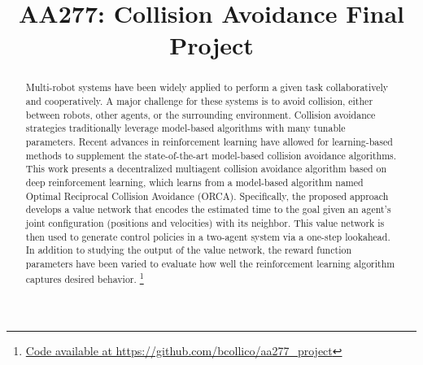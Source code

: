 \documentclass[conference]{IEEEtran}
\begin{document}
\title{AA277: Collision Avoidance Final Project\\
}

\author{
\and
{}
\linebreakand
{}
\and
{}
}

\maketitle
\begin{abstract}
Multi-robot systems have been widely applied to perform a given task collaboratively and cooperatively. A major challenge for these systems is to avoid collision, either between robots, other agents, or the surrounding environment.
Collision avoidance strategies traditionally leverage model-based algorithms with many tunable parameters. Recent advances in reinforcement learning have allowed for learning-based methods to supplement the state-of-the-art model-based collision avoidance algorithms. This work presents a decentralized multiagent collision avoidance algorithm based on deep reinforcement learning, which learns from a model-based algorithm named Optimal Reciprocal Collision Avoidance (ORCA).
Specifically, the proposed approach develops a value network that encodes the estimated time to the goal given an agent’s joint configuration (positions and velocities) with its neighbor. This value network is then used to generate control policies in a two-agent system via a one-step lookahead. In addition to studying the output of the value network, the reward function parameters have been varied to evaluate how well the reinforcement learning algorithm captures desired behavior.  \footnote{\href{https://github.com/bcollico/aa277_project}{Code available at https://github.com/bcollico/aa277\_project}}
\end{abstract}
\end{document}
